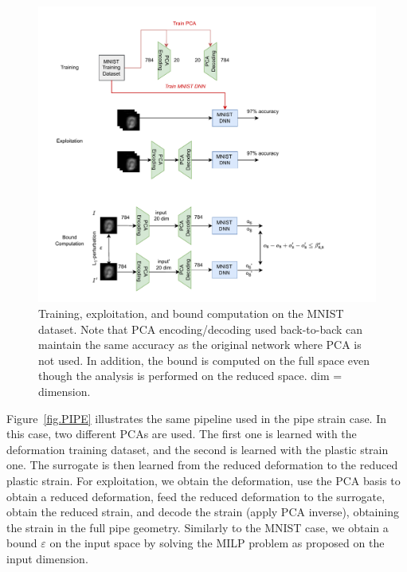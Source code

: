 \begin{figure}
    \centering
    \includegraphics[scale=0.9]{MNIST.pdf} \hspace{1.5cm}
    \caption{Training, exploitation, and bound computation on the MNIST dataset. Note that PCA encoding/decoding used back-to-back can maintain the same accuracy as the original network where PCA is not used. In addition, the bound is computed on the full space even though the analysis is performed on the reduced space. dim = dimension.}
    \label{fig.MNIST}
\end{figure}	

Figure~\ref{fig.PIPE} illustrates the same pipeline used in the pipe strain case. In this case, two different PCAs are used. The first one is learned with the deformation training dataset, and the second is learned with the plastic strain one.
%
The surrogate is then learned from the reduced deformation to the reduced plastic strain. 
%
For exploitation, we obtain the deformation, use the PCA basis to obtain a reduced deformation, feed the reduced deformation to the surrogate, obtain the reduced strain, and decode the strain (apply PCA inverse), obtaining the strain in the full pipe geometry. Similarly to the MNIST case, we obtain a bound $\varepsilon$ on the input space by solving the MILP problem as proposed on the input dimension.

